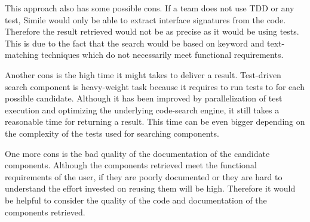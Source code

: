 This approach also has some possible cons. If a team does not use TDD or any test, Simile would only be able to extract interface signatures from the code. Therefore the result retrieved would not be as precise as it would be using tests. This is due to the fact that the search would be based on keyword and text-matching techniques which do not necessarily meet functional requirements.

Another cons is the high time it might takes to deliver a result. Test-driven search component is heavy-weight task because it requires to run tests to for each possible candidate. Although it has been improved by parallelization of test execution and optimizing the underlying code-search engine, it still takes a reasonable time for returning a result. This time can be even bigger depending on the complexity of the tests used for searching components.

One more cons is the bad quality of the documentation of the candidate components. Although the components retrieved meet the functional requirements of the user, if they are poorly documented or they are hard to understand the effort invested on reusing them will be high. Therefore it would be helpful to consider the quality of the code and documentation of the components retrieved.


 